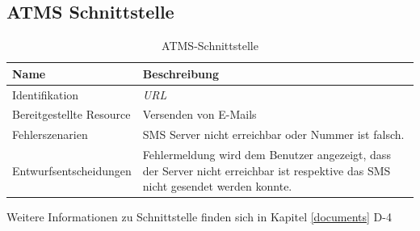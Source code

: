 \subsection{ATMS Schnittstelle}

\begin{table}[H]
	\centering
	\caption{ATMS-Schnittstelle}
	\begin{tabular}{ | p{4cm} | p{11cm} | }
		\toprule
		{\textbf{Name}} & {\textbf{Beschreibung}} \\
		\midrule
		Identifikation & \textit{\gls{URL}} \\ \hline
		Bereitgestellte Resource & Versenden von E-Mails\\ \hline
		Fehlerszenarien & SMS Server nicht erreichbar oder Nummer ist falsch.\\ \hline
		Entwurfsentscheidungen & Fehlermeldung wird dem Benutzer angezeigt, dass der Server nicht erreichbar ist respektive das SMS nicht gesendet werden konnte.\\
		\bottomrule
	\end{tabular}
\end{table}

Weitere Informationen zu Schnittstelle finden sich in Kapitel \ref{documents} D-4
